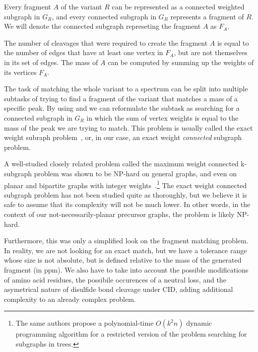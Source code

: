 \begin{lemma}\label{lemma:fragment}
  Every fragment \(A\) of the variant \(R\) can be represented as a connected weighted subgraph in \(G_R\), and every connected subgraph in \(G_R\) represents a fragment of \(R\). We will denote the connected subgraph represeting the fragment \(A\) as \(F_A\).
\end{lemma}

\begin{lemma}\label{lemma:mass}
  The number of cleavages that were required to create the fragment \(A\) is equal to the number of edges that have at least one vertex in \(F_A\), but are not themselves in its set of edges. The mass of \(A\) can be computed by summing up the weights of its vertices \(F_A\).
\end{lemma}

The task of matching the whole variant to a spectrum can be split into multiple subtasks of trying to find a fragment of the variant that matches a mass of a specific peak. By using  and  we can reformulate the subtask as searching for a connected subgraph in \(G_R\) in which the sum of vertex weights is equal to the mass of the peak we are trying to match. This problem is usually called the exact weight subraph problem~\cite{abboud2013exact}, or, in our case, an exact weight \emph{connected} subgraph problem.

A well-studied closely related problem called the maximum weight connected k-subgraph problem was shown to be NP-hard on general graphs, and even on planar and bipartite graphs with integer weights~\cite{hochbaum1994node}.\footnote{The same authors propose a polynomial-time \(O(k^2n)\) dynamic programming algorithm for a restricted version of the problem searching for subgraphs in trees.} The exact weight connected subgraph problem has not been studied quite as thoroughly, but we believe it is safe to assume that its complexity will not be much lower. In other words, in the context of our not-necessarily-planar precursor graphs, the problem is likely NP-hard.

Furthermore, this was only a simplified look on the fragment matching problem. In reality, we are not looking for an exact match, but we have a tolerance range whose size is not absolute, but is defined relative to the mass of the generated fragment (in ppm). We also have to take into account the possible modifications of amino acid residues, the possibile occurences of a neutral loss, and the asymetrical nature of disulfide bond cleavage under CID, adding additional complexity to an already complex problem.

